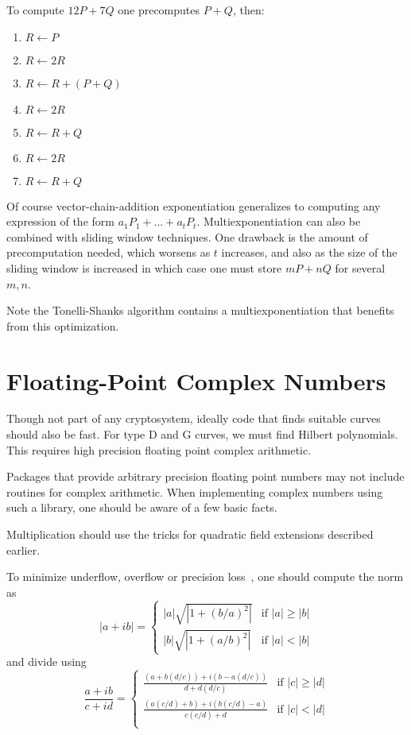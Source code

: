 To compute $12 P + 7 Q$ one precomputes $P + Q$, then:

\begin{enumerate}
\item
$R \gets P$
\item
$R \gets 2R$
\item
$R \gets R + (P + Q)$
\item
$R \gets 2R$
\item
$R \gets R + Q$
\item
$R \gets 2R$
\item
$R \gets R + Q$
\end{enumerate}

Of course vector-chain-addition exponentiation generalizes
to computing any expression of the form
$a_1 P_1 + ... + a_t P_t$. Multiexponentiation can also be combined with
sliding window techniques.
One drawback is the amount of precomputation needed,
which worsens as $t$ increases, and also as the size of the sliding window
is increased in which case one must store $m P + n Q$ for several $m, n$.

Note the Tonelli-Shanks algorithm contains a multiexponentiation
that benefits from this optimization.

\section{Floating-Point Complex Numbers}

Though not part of any cryptosystem, ideally code that finds suitable
curves should also be fast. For type D and G curves, we must
find Hilbert polynomials. This requires high precision
floating point complex arithmetic.

Packages that provide arbitrary precision floating point numbers
may not include routines for complex arithmetic. When implementing
complex numbers using such a library, one should be aware of a few basic
facts.

Multiplication should use the
tricks for quadratic field extensions described earlier.

To minimize underflow, overflow or precision loss~\cite{numericalrecipes},
one should compute the norm as
\[
|a+ib| = \left\{
\begin{array}{ll}
|a|\sqrt{|1+(b/a)^2|} & \mbox{if $|a| \ge |b|$} \\
|b|\sqrt{|1+(a/b)^2|} & \mbox{if $|a| < |b|$}
\end{array}
\right.
\]
and divide using
\[
\frac{a+ib}{c+id} =
\left\{\begin{array}{ll}
\frac{(a+b(d/c))+i(b-a(d/c))}{d+d(d/c)} & \mbox{if $|c|\ge|d|$} \\
\frac{(a(c/d) + b)+i(b(c/d)-a)}{c(c/d)+d} & \mbox{if $|c|<|d|$} \\
\end{array}\right.
\]
